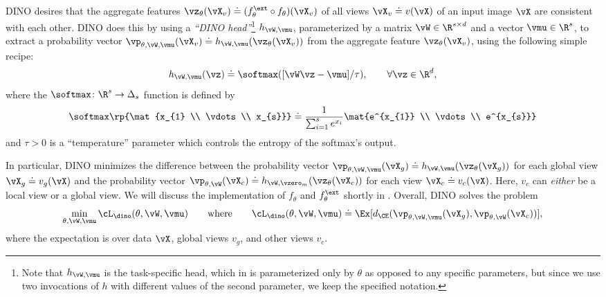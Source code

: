 \documentclass[../../book-main.tex]{subfiles}
\begin{document}
DINO desires that the aggregate features \(\vz_{\theta}(\vX_{v}) \doteq (f_{\theta}^{\ext} \circ f_{\theta})(\vX_{v})\) of all views \(\vX_{v} \doteq v(\vX)\) of an input image \(\vX\) are consistent with each other. DINO does this by using a \textit{``DINO head''}\footnote{Note that \(h_{\vW, \vmu}\) is the task-specific head, which in  is parameterized only by \(\theta\) as opposed to any specific parameters, but since we use two invocations of \(h\) with different values of the second parameter, we keep the specified notation.} \(h_{\vW, \vmu}\), parameterized by a matrix \(\vW \in \R^{s \times d}\) and a vector \(\vmu \in \R^{s}\), to extract a probability vector \(\vp_{\theta, \vW, \vmu}(\vX_{v}) \doteq h_{\vW, \vmu}(\vz_{\theta}(\vX_{v}))\) from the aggregate feature \(\vz_{\theta}(\vX_{v})\), using the following simple recipe:
\begin{equation}
    h_{\vW, \vmu}(\vz) \doteq \softmax([\vW\vz - \vmu]/\tau), \qquad \forall \vz \in \R^{d},
\end{equation}
where the \(\softmax \colon \R^{s} \to \Delta_{s}\) function is defined by 
\begin{equation}
    \softmax\rp{\mat{x_{1} \\ \vdots \\ x_{s}}} \doteq \frac{1}{\sum_{i = 1}^{s}e^{x_{i}}}\mat{e^{x_{1}} \\ \vdots \\ e^{x_{s}}}
\end{equation}
and \(\tau > 0\) is a ``temperature'' parameter which controls the entropy of the softmax's output.

In particular, DINO minimizes the difference between the probability vector \(\vp_{\theta, \vW, \vmu}(\vX_{g}) \doteq h_{\vW, \vmu}(\vz_{\theta}(\vX_{g}))\) for each global view \(\vX_{g} \doteq v_{g}(\vX)\) and the probability vector \(\vp_{\theta, \vW}(\vX_{c}) \doteq h_{\vW, \vzero_{m}}(\vz_{\theta}(\vX_{c}))\) for each view \(\vX_{c} \doteq v_{c}(\vX)\). Here, \(v_{c}\) can \textit{either} be a local view or a global view. We will discuss the implementation of \(f_{\theta}\) and \(f_{\theta}^{\ext}\) shortly in . Overall, DINO solves the problem
 \begin{equation}\label{eq:dino_loss}
     \min_{\theta, \vW, \vmu}\cL_{\dino}(\theta, \vW, \vmu) \qquad \text{where} \qquad \cL_{\dino}(\theta, \vW, \vmu) \doteq \Ex[d_{\CE}(\vp_{\theta, \vW, \vmu}(\vX_{g}), \vp_{\theta, \vW}(\vX_{c}))],
\end{equation}
where the expectation is over data \(\vX\), global views \(v_{g}\), and other views \(v_{c}\).
\end{document}
